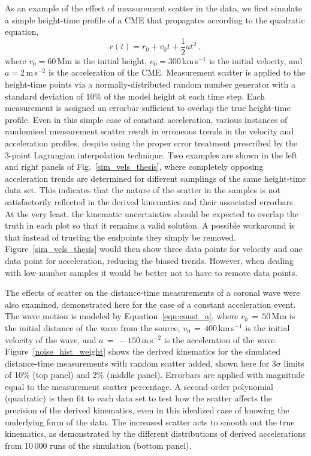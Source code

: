 \documentclass[structabstract]{aa}
\begin{document}
As an example of the effect of measurement scatter in the data, we first simulate a simple height-time profile of a CME that propagates according to the quadratic equation,
\begin{equation}
\label{eqn:const_a}
r(t) = r_0 + v_0 t + \frac{1}{2}a t^2 \ ,
\end{equation}
where $r_0=$60\,Mm is the initial height, $v_0=$300\,km\,s$^{-1}$ is the initial velocity, and $a=$2\,m\,s$^{-2}$ is the acceleration of the CME. Measurement scatter is applied to the height-time points via a normally-distributed random number generator with a standard deviation of 10\% of the model height at each time step. Each measurement is assigned an errorbar sufficient to overlap the true height-time profile. Even in this simple case of constant acceleration, various instances of randomised measurement scatter result in erroneous trends in the velocity and acceleration profiles, despite using the proper error treatment prescribed by the 3-point Lagrangian interpolation technique. Two examples are shown in the left and right panels of Fig.~\ref{sim_vels_thesis}, where completely opposing acceleration trends are determined for different samplings of the same height-time data set. This indicates that the nature of the scatter in the samples is not satisfactorily reflected in the derived kinematics and their associated errorbars. At the very least, the kinematic uncertainties should be expected to overlap the truth in each plot so that it remains a valid solution. A possible workaround is that instead of trusting the endpoints they simply be removed. Figure~\ref{sim_vels_thesis} would then show three data points for velocity and one data point for acceleration, reducing the biased trends. However, when dealing with low-number samples it would be better not to have to remove data points.


The effects of scatter on the distance-time measurements of a coronal wave were also examined, demonstrated here for the case of a constant acceleration event. The wave motion is modeled by Equation~\ref{eqn:const_a}, where $r_0\,=\,50$\,Mm is the initial distance of the wave from the source, $v_0\,=\,400$\,km\,s$^{-1}$ is the initial velocity of the wave, and $a\,=\,-150$\,m\,s$^{-2}$ is the acceleration of the wave. Figure~\ref{noise_hist_weight} shows the derived kinematics for the simulated distance-time measurements with random scatter added, shown here for 3$\sigma$ limits of 10\% (top panel) and 2\% (middle panel). Errorbars are applied with magnitude equal to the measurement scatter percentage. A second-order polynomial (quadratic) is then fit to each data set to test how the scatter affects the precision of the derived kinematics, even in this idealized case of knowing the underlying form of the data. The increased scatter acts to smooth out the true kinematics, as demonstrated by the different distributions of derived accelerations from 10\,000 runs of the simulation (bottom panel).
\end{document}
